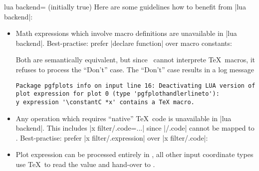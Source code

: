 {\begin{pgfplotskey}{lua backend= (initially true)}
	Here are some guidelines how to benefit from |lua backend|:
	\begin{itemize}
		\item Math expressions which involve macro definitions are unavailable in |lua backend|. Best-practise: prefer |declare function| over macro constants:
\begin{codeexample}[]
\end{codeexample}
\begin{codeexample}[]
\end{codeexample}

		Both are semantically equivalent, but since \lua\ cannot interprete \TeX\ macros, it refuses to process the ``Don't'' case. The ``Don't'' case results in a log message

\begin{verbatim}
Package pgfplots info on input line 16: Deactivating LUA version of 
plot expression for plot 0 (type 'pgfplothandlerlineto'): 
y expression '\constantC *x' contains a TeX macro.
\end{verbatim}

		\item Any operation which requires ``native'' \TeX\ code is unavailable in |lua backend|. This includes |x filter/.code={...}| since |/.code| cannot be mapped to \lua. Best-practise: prefer |x filter/.expression| over |x filter/.code|:
\begin{codeexample}[]
\end{codeexample}

		\item Plot expression can be processed entirely in \lua, all other input coordinate types use \TeX\ to read the value and hand-over to \lua.


\end{itemize}
\end{pgfplotskey}}
